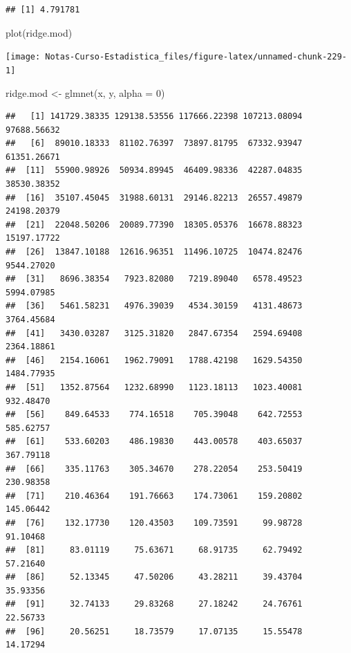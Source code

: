 \documentclass[
  12pt,
]{book}
\newenvironment{Shaded}{\begin{snugshade}}{\end{snugshade}}
\newcommand{\AttributeTok}[1]{\textcolor[rgb]{0.77,0.63,0.00}{#1}}
\newcommand{\DecValTok}[1]{\textcolor[rgb]{0.00,0.00,0.81}{#1}}
\newcommand{\FunctionTok}[1]{\textcolor[rgb]{0.00,0.00,0.00}{#1}}
\newcommand{\NormalTok}[1]{#1}
\newcommand{\OtherTok}[1]{\textcolor[rgb]{0.56,0.35,0.01}{#1}}
\newcommand{\SpecialCharTok}[1]{\textcolor[rgb]{0.00,0.00,0.00}{#1}}
\begin{document}
\begin{verbatim}
## [1] 4.791781
\end{verbatim}

\begin{Shaded}
\begin{Highlighting}[]
\FunctionTok{plot}\NormalTok{(ridge.mod)}
\end{Highlighting}
\end{Shaded}

\begin{center}\texttt{[image: Notas-Curso-Estadistica\_files/figure-latex/unnamed-chunk-229-1]} \end{center}

\begin{Shaded}
\begin{Highlighting}[]
\NormalTok{ridge.mod }\OtherTok{\textless{}{-}} \FunctionTok{glmnet}\NormalTok{(x, y, }\AttributeTok{alpha =} \DecValTok{0}\NormalTok{)}
\end{Highlighting}
\end{Shaded}

\begin{Shaded}
\end{Shaded}

\begin{verbatim}
##   [1] 141729.38335 129138.53556 117666.22398 107213.08094  97688.56632
##   [6]  89010.18333  81102.76397  73897.81795  67332.93947  61351.26671
##  [11]  55900.98926  50934.89945  46409.98336  42287.04835  38530.38352
##  [16]  35107.45045  31988.60131  29146.82213  26557.49879  24198.20379
##  [21]  22048.50206  20089.77390  18305.05376  16678.88323  15197.17722
##  [26]  13847.10188  12616.96351  11496.10725  10474.82476   9544.27020
##  [31]   8696.38354   7923.82080   7219.89040   6578.49523   5994.07985
##  [36]   5461.58231   4976.39039   4534.30159   4131.48673   3764.45684
##  [41]   3430.03287   3125.31820   2847.67354   2594.69408   2364.18861
##  [46]   2154.16061   1962.79091   1788.42198   1629.54350   1484.77935
##  [51]   1352.87564   1232.68990   1123.18113   1023.40081    932.48470
##  [56]    849.64533    774.16518    705.39048    642.72553    585.62757
##  [61]    533.60203    486.19830    443.00578    403.65037    367.79118
##  [66]    335.11763    305.34670    278.22054    253.50419    230.98358
##  [71]    210.46364    191.76663    174.73061    159.20802    145.06442
##  [76]    132.17730    120.43503    109.73591     99.98728     91.10468
##  [81]     83.01119     75.63671     68.91735     62.79492     57.21640
##  [86]     52.13345     47.50206     43.28211     39.43704     35.93356
##  [91]     32.74133     29.83268     27.18242     24.76761     22.56733
##  [96]     20.56251     18.73579     17.07135     15.55478     14.17294
\end{verbatim}
\end{document}
